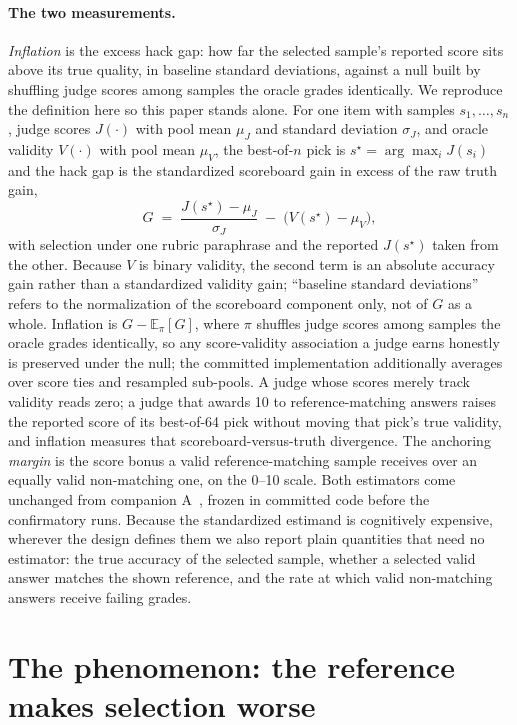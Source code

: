\documentclass[11pt]{article}
\begin{document}
\paragraph{The two measurements.}
\emph{Inflation} is the excess hack gap: how far the selected sample's reported score sits above its true quality, in baseline standard deviations, against a null built by shuffling judge scores among samples the oracle grades identically.
We reproduce the definition here so this paper stands alone.
For one item with samples $s_1, \dots, s_n$, judge scores $J(\cdot)$ with pool mean $\mu_J$ and standard deviation $\sigma_J$, and oracle validity $V(\cdot)$ with pool mean $\mu_V$, the best-of-$n$ pick is $s^\star = \arg\max_i J(s_i)$ and the hack gap is the standardized scoreboard gain in excess of the raw truth gain,
\begin{equation}
G \;=\; \frac{J(s^\star) - \mu_J}{\sigma_J} \;-\; \bigl(V(s^\star) - \mu_V\bigr),
\end{equation}
with selection under one rubric paraphrase and the reported $J(s^\star)$ taken from the other.
Because $V$ is binary validity, the second term is an absolute accuracy gain rather than a standardized validity gain; ``baseline standard deviations'' refers to the normalization of the scoreboard component only, not of $G$ as a whole.
Inflation is $G - \mathbb{E}_\pi[G]$, where $\pi$ shuffles judge scores among samples the oracle grades identically, so any score-validity association a judge earns honestly is preserved under the null; the committed implementation additionally averages over score ties and resampled sub-pools.
A judge whose scores merely track validity reads zero; a judge that awards 10 to reference-matching answers raises the reported score of its best-of-64 pick without moving that pick's true validity, and inflation measures that scoreboard-versus-truth divergence.
The anchoring \emph{margin} is the score bonus a valid reference-matching sample receives over an equally valid non-matching one, on the 0--10 scale.
Both estimators come unchanged from companion A~\cite{companionA}, frozen in committed code before the confirmatory runs.
Because the standardized estimand is cognitively expensive, wherever the design defines them we also report plain quantities that need no estimator: the true accuracy of the selected sample, whether a selected valid answer matches the shown reference, and the rate at which valid non-matching answers receive failing grades.

\section{The phenomenon: the reference makes selection worse}
\label{sec:phenomenon}
\end{document}
